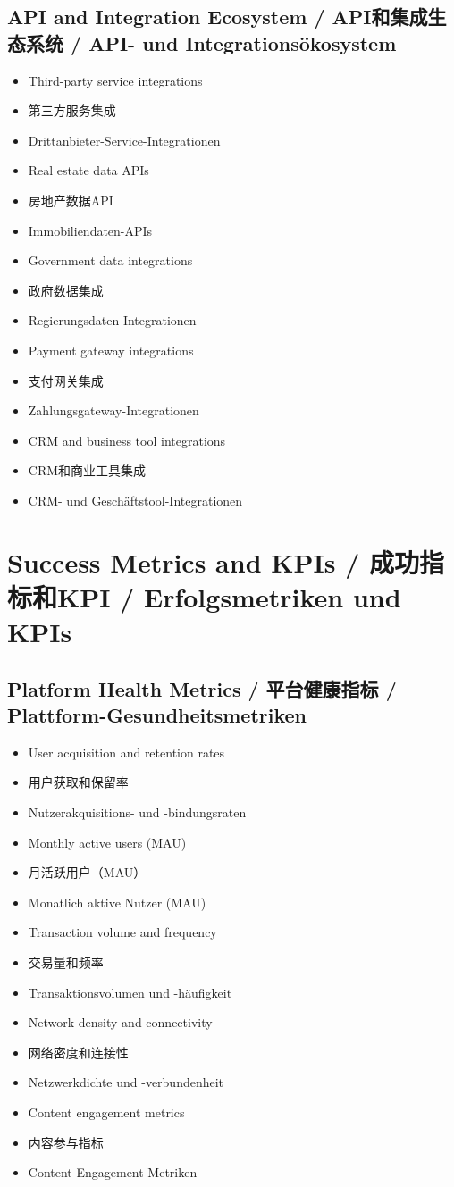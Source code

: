 \subsection{API and Integration Ecosystem / API和集成生态系统 / API- und Integrationsökosystem}
\begin{itemize}
    \item Third-party service integrations
    \item 第三方服务集成
    \item Drittanbieter-Service-Integrationen
    \item Real estate data APIs
    \item 房地产数据API
    \item Immobiliendaten-APIs
    \item Government data integrations
    \item 政府数据集成
    \item Regierungsdaten-Integrationen
    \item Payment gateway integrations
    \item 支付网关集成
    \item Zahlungsgateway-Integrationen
    \item CRM and business tool integrations
    \item CRM和商业工具集成
    \item CRM- und Geschäftstool-Integrationen
\end{itemize}

\section{Success Metrics and KPIs / 成功指标和KPI / Erfolgsmetriken und KPIs}

\subsection{Platform Health Metrics / 平台健康指标 / Plattform-Gesundheitsmetriken}
\begin{itemize}
    \item User acquisition and retention rates
    \item 用户获取和保留率
    \item Nutzerakquisitions- und -bindungsraten
    \item Monthly active users (MAU)
    \item 月活跃用户（MAU）
    \item Monatlich aktive Nutzer (MAU)
    \item Transaction volume and frequency
    \item 交易量和频率
    \item Transaktionsvolumen und -häufigkeit
    \item Network density and connectivity
    \item 网络密度和连接性
    \item Netzwerkdichte und -verbundenheit
    \item Content engagement metrics
    \item 内容参与指标
    \item Content-Engagement-Metriken
\end{itemize}

